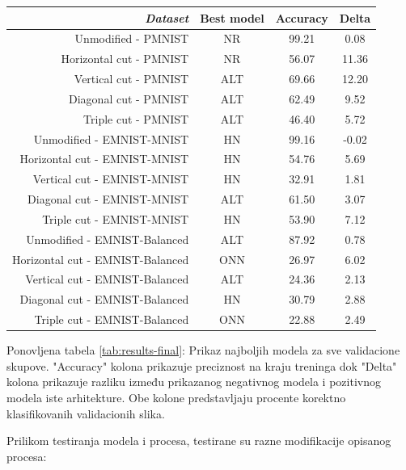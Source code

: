 \begin{table}[ht]
  \centering
  \begin{tabular}{rS[table-format=12.1]S[table-format=32.1]S[table-format=42.1]}
    \toprule
     \textit{Dataset} & {Best model} & {Accuracy} & {Delta} \\
    \midrule
    {Unmodified - PMNIST}  & {NR} & {99.21} & {0.08} \\
    {Horizontal cut - PMNIST} & {NR} & {56.07} & {11.36} \\
    {Vertical cut - PMNIST} & {ALT} & {69.66} & {12.20} \\
    {Diagonal cut - PMNIST} & {ALT} & {62.49} & {9.52} \\
    {Triple cut - PMNIST} & {ALT} & {46.40} & {5.72} \\
    {Unmodified - EMNIST-MNIST} & {HN} & {99.16} & {-0.02} \\
    {Horizontal cut - EMNIST-MNIST} & {HN} & {54.76} & {5.69} \\
    {Vertical cut - EMNIST-MNIST} & {HN} & {32.91} & {1.81} \\
    {Diagonal cut - EMNIST-MNIST} & {ALT} & {61.50} & {3.07} \\
    {Triple cut - EMNIST-MNIST} & {HN} & {53.90} & {7.12} \\
    {Unmodified - EMNIST-Balanced} & {ALT} & {87.92} & {0.78} \\
    {Horizontal cut - EMNIST-Balanced} & {ONN} & {26.97} & {6.02} \\
    {Vertical cut - EMNIST-Balanced} & {ALT} & {24.36} & {2.13} \\
    {Diagonal cut - EMNIST-Balanced} & {HN} & {30.79} & {2.88} \\
    {Triple cut - EMNIST-Balanced} & {ONN} & {22.88} & {2.49} \\
    
    \bottomrule
  \end{tabular}
  {Ponovljena tabela \ref{tab:results-final}: Prikaz najboljih modela za sve validacione skupove. "Accuracy" kolona prikazuje preciznost na kraju treninga dok "Delta" kolona prikazuje razliku između prikazanog negativnog modela i pozitivnog modela iste arhitekture. Obe kolone predstavljaju procente korektno klasifikovanih validacionih slika.}
\end{table}

Prilikom testiranja modela i procesa, testirane su razne modifikacije opisanog procesa:

